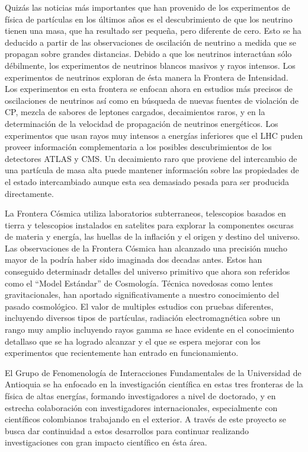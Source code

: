 Quizás las noticias más importantes que han provenido de los
experimentos de física de partículas en los últimos años es el
descubrimiento de que los neutrino tienen una masa, que ha resultado
ser pequeña, pero diferente de cero. Esto se ha deducido a partir de
las observaciones de oscilación de neutrino a medida que se propagan
sobre grandes distancias. Debido a que los neutrinos interactúan sólo
débilmente, los experimentos de neutrinos blancos masivos y rayos
intensos. Los experimentos de neutrinos exploran de ésta manera la
Frontera de Intensidad. Los experimentos en esta frontera se enfocan
ahora en estudios más precisos de oscilaciones de neutrinos así como
en búsqueda de nuevas fuentes de violación de CP, mezcla de sabores de
leptones cargados, decaimientos raros, y en la determinación de la
velocidad de propagación de neutrinos energéticos. Los experimentos
que usan rayos muy intensos a energías inferiores que el LHC puden
proveer información complementaria a los posibles descubrimientos de
los detectores ATLAS y CMS. Un decaimiento raro que proviene del
intercambio de una partícula de masa alta puede mantener información
sobre las propiedades de el estado intercambiado aunque esta sea
demasiado pesada para ser producida directamente.

La Frontera Cósmica utiliza laboratorios subterraneos, telescopios
basados en tierra y telescopios instalados en satelites para explorar
la componentes oscuras de materia y energía, las huellas de la
inflación y el origen y destino del universo. Las observaciones de la
Frontera Cósmica han alcanzado una precisión mucho mayor de la podría
haber sido imaginada dos decadas antes. Estos han conseguido
determinadr detalles del universo primitivo que ahora son referidos
como el ``Model Estándar'' de Cosmología. Técnica novedosas como
lentes gravitacionales, han aportado significativamente a nuestro
conocimiento del pasado cosmológico. El valor de multiples estudios
con pruebas diferentes, incluyendo diversos tipos de partículas,
radiación electromagnética sobre un rango muy amplio incluyendo rayos
gamma se hace evidente en el conocimiento detallaso que se ha logrado
alcanzar y el que se espera mejorar con los experimentos que
recientemente han entrado en funcionamiento.

El Grupo de Fenomenología de Interacciones Fundamentales de la
Universidad de Antioquia se ha enfocado en la investigación científica
en estas tres fronteras de la física de altas energías, formando
investigadores a nivel de doctorado, y en estrecha
colaboración con investigadores internacionales, especialmente con
científicos colombianos trabajando en el exterior. A través de este
proyecto se busca dar continuidad  a estos desarrollos para continuar
realizando investigaciones con gran impacto científico en ésta área. 

